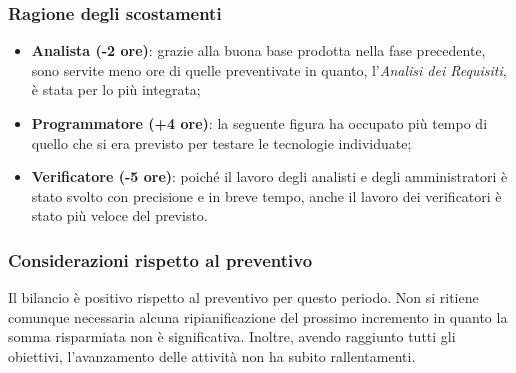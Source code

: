 \subsubsection{Ragione degli scostamenti}
 
\begin{itemize}
\item \textbf{Analista (-2 ore)}: grazie alla buona base prodotta nella fase precedente, sono servite meno ore di quelle preventivate in quanto, l'\textit{Analisi dei Requisiti}, è stata per lo più integrata;

\item \textbf{Programmatore (+4 ore)}: la seguente figura ha occupato più tempo di quello che si era previsto per testare le tecnologie individuate;

\item \textbf{Verificatore (-5 ore)}: poiché il lavoro degli analisti e degli amministratori è stato svolto con precisione e in breve tempo, anche il lavoro dei verificatori è stato più veloce del previsto.
\end{itemize}

\subsubsection{Considerazioni rispetto al preventivo}

Il bilancio è positivo rispetto al preventivo per questo periodo. Non si ritiene comunque necessaria alcuna ripianificazione del prossimo incremento in quanto la somma risparmiata non è significativa. Inoltre, avendo raggiunto tutti gli obiettivi, l'avanzamento delle attività non ha subito rallentamenti.

\newpage

